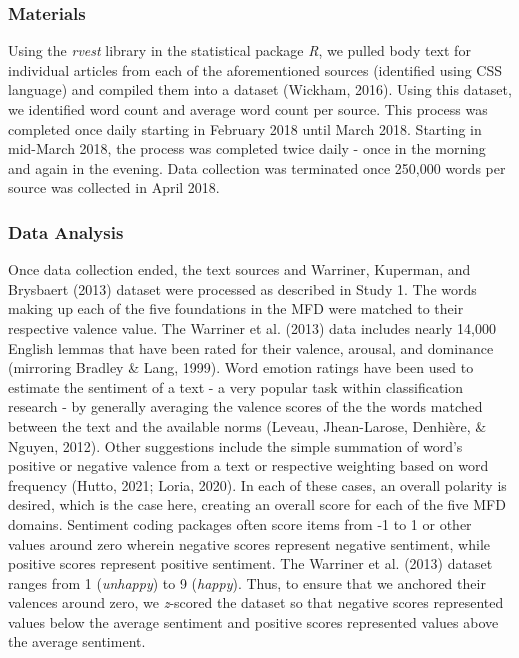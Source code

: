 \documentclass[
  man,floatsintext]{apa6}
\begin{document}
\subsubsection{Materials}\label{materials}

Using the \emph{rvest} library in the statistical package \emph{R}, we pulled body
text for individual articles from each of the aforementioned sources
(identified using CSS language) and compiled them into a dataset
(Wickham, 2016). Using this dataset, we identified word count and average
word count per source. This process was completed once daily starting in
February 2018 until March 2018. Starting in mid-March 2018, the process
was completed twice daily - once in the morning and again in the
evening. Data collection was terminated once 250,000 words per source
was collected in April 2018.

\subsubsection{Data Analysis}\label{data-analysis}

Once data collection ended, the text sources and Warriner, Kuperman, and Brysbaert (2013) dataset were processed as described in Study 1. The words making up each of the five foundations in the MFD were matched to their respective valence value. The Warriner et al. (2013) data includes nearly 14,000 English lemmas that have
been rated for their valence, arousal, and dominance (mirroring Bradley \& Lang, 1999). Word emotion ratings have been used to estimate the
sentiment of a text - a very popular task within classification
research - by generally averaging the valence scores of the the words
matched between the text and the available norms (Leveau, Jhean-Larose, Denhière, \& Nguyen, 2012). Other
suggestions include the simple summation of word's positive or negative
valence from a text or respective weighting based on word frequency
(Hutto, 2021; Loria, 2020). In each of these cases, an overall polarity is
desired, which is the case here, creating an overall score for each of
the five MFD domains. Sentiment coding packages often score items from
-1 to 1 or other values around zero wherein negative scores represent
negative sentiment, while positive scores represent positive sentiment.
The Warriner et al. (2013) dataset ranges from 1 (\emph{unhappy}) to 9 (\emph{happy}).
Thus, to ensure that we anchored their valences around zero, we
\emph{z}-scored the dataset so that negative scores represented values below
the average sentiment and positive scores represented values above the
average sentiment.
\end{document}
